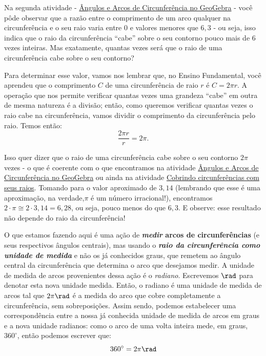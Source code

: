 Na segunda atividade - \hyperref[trig-ativ8]{Ângulos e Arcos de Circunferência no GeoGebra} - você pôde observar que a razão entre o comprimento de um arco qualquer na circunferência e o seu raio varia entre $0$ e valores menores que $6{,}3$ - ou seja, isso indica que o raio da circunferência “cabe”{} sobre o seu contorno pouco mais de $6$ vezes inteiras. Mas exatamente, quantas vezes será que o raio de uma circunferência cabe sobre o seu contorno?

Para determinar esse valor, vamos nos lembrar que, no Ensino Fundamental, você aprendeu que o comprimento $C$ de uma circunferência de raio $r$ é $C=2\pi r$. A operação que nos permite verificar quantas vezes uma grandeza “cabe”{} em outra de mesma natureza é a divisão; então, como queremos verificar quantas vezes o raio cabe na circunferência, vamos dividir o comprimento da circunferência pelo raio. Temos então:
\begin{equation*}
\frac{2\pi r}{r}=2\pi.
\end{equation*}

Isso quer dizer que o raio de uma circunferência cabe sobre o seu contorno $2\pi$ vezes - o que é coerente com o que encontramos na atividade \hyperref[trig-ativ8]{Ângulos e Arcos de Circunferência no GeoGebra} ou ainda na atividade \hyperref[trig-ativ7]{Cobrindo circunferências com seus raios}. Tomando para   o valor aproximado de $3{,}14$ (lembrando que esse é uma aproximação, na verdade,$\pi$ é um número irracional!), encontramos $2\cdot\pi\cong2\cdot3{,}14=6{,}28$, ou seja, pouco menos do que $6,3$. E observe: esse resultado não depende do raio da circunferência!

O que estamos fazendo aqui é uma ação de \textbf{\textit{medir} arcos de circunferências} (e seus respectivos ângulos centrais), mas usando o \textbf{\textit{raio da circunferência como unidade de medida}} e não os já conhecidos graus, que remetem ao ângulo central da circunferência que determina o arco que desejamos medir. A unidade de medida de arcos provenientes dessa ação é o \textit{radiano}. Escrevemos $\rad$ para denotar esta nova unidade medida. Então, o radiano é uma unidade de medida de arcos tal que $2\pi \rad$ é a medida do arco que cobre completamente a circunferência, sem sobreposições. Assim sendo, podemos estabelecer uma correspondência entre a nossa já conhecida unidade de medida de arcos em graus e a nova unidade radianos: como o arco de uma volta inteira mede, em graus, $360^{\circ}$, então podemos escrever que:
\begin{equation*}
360^{\circ}=2\pi\rad
\end{equation*}

